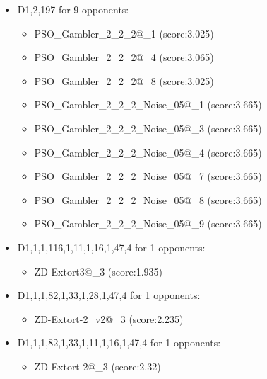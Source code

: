 \begin{appendices}
\begin{itemize}
        \item D1,2,197 for 9 opponents:
        \begin{multicols}{3}
            \begin{itemize}
                \item PSO\_Gambler\_2\_2\_2@\_1 (score:3.025)
                \item PSO\_Gambler\_2\_2\_2@\_4 (score:3.065)
                \item PSO\_Gambler\_2\_2\_2@\_8 (score:3.025)
                \item PSO\_Gambler\_2\_2\_2\_Noise\_05@\_1 (score:3.665)
                \item PSO\_Gambler\_2\_2\_2\_Noise\_05@\_3 (score:3.665)
                \item PSO\_Gambler\_2\_2\_2\_Noise\_05@\_4 (score:3.665)
                \item PSO\_Gambler\_2\_2\_2\_Noise\_05@\_7 (score:3.665)
                \item PSO\_Gambler\_2\_2\_2\_Noise\_05@\_8 (score:3.665)
                \item PSO\_Gambler\_2\_2\_2\_Noise\_05@\_9 (score:3.665)
            \end{itemize}
        \end{multicols}

        \item D1,1,1,116,1,11,1,16,1,47,4 for 1 opponents:
        \begin{multicols}{3}
            \begin{itemize}
                \item ZD-Extort3@\_3 (score:1.935)
            \end{itemize}
        \end{multicols}

        \item D1,1,1,82,1,33,1,28,1,47,4 for 1 opponents:
        \begin{multicols}{3}
            \begin{itemize}
                \item ZD-Extort-2\_v2@\_3 (score:2.235)
            \end{itemize}
        \end{multicols}

        \item D1,1,1,82,1,33,1,11,1,16,1,47,4 for 1 opponents:
        \begin{multicols}{3}
            \begin{itemize}
                \item ZD-Extort-2@\_3 (score:2.32)
            \end{itemize}
        \end{multicols}


\end{itemize}
\end{appendices}
